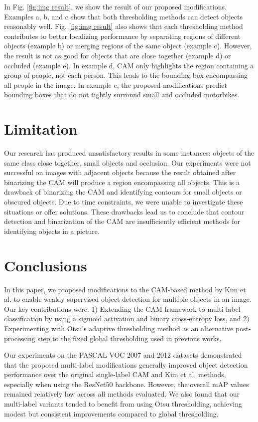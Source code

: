 \documentclass[conference]{IEEEtran}
\begin{document}
In Fig. \ref{fig:img result}, we show the result of our proposed modifications. Examples a, b, and c show that both thresholding methods can detect objects reasonably well. Fig. \ref{fig:img result} also shows that each thresholding method contributes to better localizing performance by separating regions of different objects (example b) or merging regions of the same object (example c). However, the result is not as good for objects that are close together (example d) or occluded (example e). In example d, CAM only highlights the region containing a group of people, not each person. This leads to the bounding box encompassing all people in the image. In example e, the proposed modifications predict bounding boxes that do not tightly surround small and occluded motorbikes.


\section{Limitation}
Our research has produced unsatisfactory results in some instances: objects of the same class close together, small objects and occlusion. Our experiments were not successful on images with adjacent objects because the result obtained after binarizing the CAM will produce a region encompassing all objects. This is a drawback of binarizing the CAM and identifying contours for small objects or obscured objects. Due to time constraints, we were unable to investigate these situations or offer solutions. These drawbacks lead us to conclude that contour detection and binarization of the CAM are insufficiently efficient methods for identifying objects in a picture.

\section{Conclusions}
In this paper, we proposed modifications to the CAM-based method by Kim et al. \cite{kim2022bridging} to enable weakly supervised object detection for multiple objects in an image. Our key contributions were: 1) Extending the CAM framework to multi-label classification by using a sigmoid activation and binary cross-entropy loss, and 2) Experimenting with Otsu's adaptive thresholding method \cite{otsu} as an alternative post-processing step to the fixed global thresholding used in previous works.

Our experiments on the PASCAL VOC 2007 and 2012 datasets demonstrated that the proposed multi-label modifications generally improved object detection performance over the original single-label CAM and Kim et al. methods, especially when using the ResNet50 backbone. However, the overall mAP values remained relatively low across all methods evaluated. We also found that our multi-label variants tended to benefit from using Otsu thresholding, achieving modest but consistent improvements compared to global thresholding.
\end{document}
